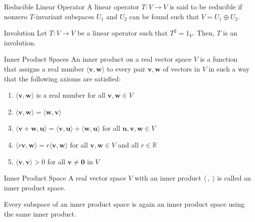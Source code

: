 \documentclass[12pt]{article}
\begin{document}
\begin{definition}{Reducible Linear Operator}{}
    A linear operator $ T : V \to V $ is said to be reducible if nonzero $ T $-invariant subspaces $ U_1 $ and $ U_2 $ can be found such that $ V = U_1 \oplus U_2 $.
\end{definition}

\begin{definition}{Involution}{}
    Let $ T : V \to V $ be a linear operator such that $ T^2 = 1_V $. Then, $ T $ is an involution.
\end{definition}

\begin{definition}{Inner Product Spaces}{}
    An inner product on a real vector space $ V $ is a function that assigns a real number $ \langle \mathbf{v}, \mathbf{w} \rangle $ to every pair $ \mathbf{v}, \mathbf{w} $ of vectors in $ V $ in such a way that the following axioms are satisfied:
    \begin{enumerate}[label=(\roman*)]
        \item $ \langle \mathbf{v}, \mathbf{w} \rangle $ is a real number for all $ \mathbf{v}, \mathbf{w} \in V $
        \item $ \langle \mathbf{v}, \mathbf{w} \rangle = \langle \mathbf{w}, \mathbf{v} \rangle $
        \item $ \langle \mathbf{v} + \mathbf{w}, \mathbf{u} \rangle = \langle \mathbf{v}, \mathbf{u} \rangle + \langle \mathbf{w}, \mathbf{u} \rangle $ for all $ \mathbf{u}, \mathbf{v}, \mathbf{w} \in V $
        \item $ \langle r \mathbf{v}, \mathbf{w} \rangle = r \langle \mathbf{v}, \mathbf{w} \rangle $ for all $ \mathbf{v}, \mathbf{w} \in V $ and all $ r \in \mathbb{R} $
        \item $ \langle \mathbf{v}, \mathbf{v} \rangle > 0 $ for all $ \mathbf{v} \neq \mathbf{0} $ in $ V $
    \end{enumerate}
\end{definition}

\begin{definition}{Inner Product Space}{}
    A real vector space $ V $ with an inner product $ \langle \ , \ \rangle $ is called an inner product space.
\end{definition}

\begin{note}{}{}
    Every subspace of an inner product space is again an inner product space using the same inner product.
\end{note}
\end{document}
